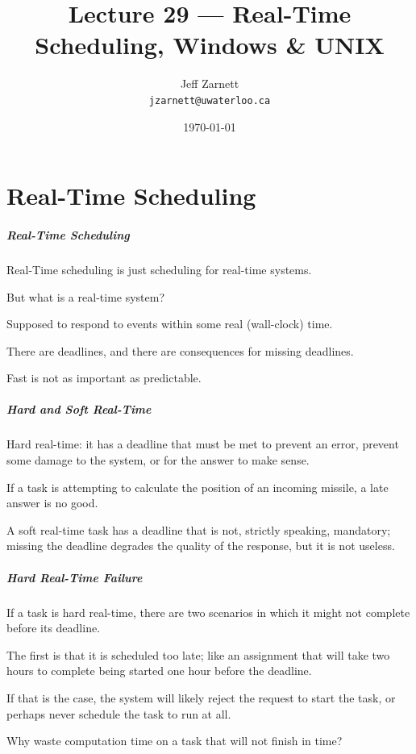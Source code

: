 

\title{Lecture 29 --- Real-Time Scheduling, Windows \& UNIX}

\author{Jeff Zarnett \\ \small \texttt{jzarnett@uwaterloo.ca}}
\date{\today}




\begin{frame}
  \titlepage

 \end{frame}

\part{Real-Time Scheduling}

\begin{frame}
\partpage
\end{frame}

\begin{frame}
\frametitle{Real-Time Scheduling}

Real-Time scheduling is just scheduling for real-time systems.

But what is a real-time system?

Supposed to respond to events within some real (wall-clock) time. 

There are deadlines, and there are consequences for missing deadlines. 

Fast is not as important as predictable.

\end{frame}

\begin{frame}
\frametitle{Hard and Soft Real-Time}

\alert{Hard real-time}: it has a deadline that must be met to prevent an error, prevent some damage to the system, or for the answer to make sense. 

If a task is attempting to calculate the position of an incoming missile, a late answer is no good. 

A \alert{soft real-time} task has a deadline that is not, strictly speaking, mandatory; missing the deadline degrades the quality of the response, but it is not useless.


\end{frame}

\begin{frame}
\frametitle{Hard Real-Time Failure}

If a task is hard real-time, there are two scenarios in which it might not complete before its deadline. 

The first is that it is scheduled too late; like an assignment that will take two hours to complete being started one hour before the deadline. 

If that is the case, the system will likely reject the request to start the task, or perhaps never schedule the task to run at all. 

Why waste computation time on a task that will not finish in time? 

\end{frame}

